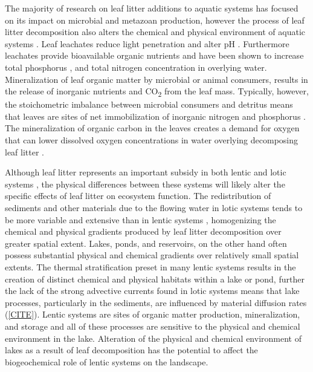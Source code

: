 The majority of research on leaf litter additions to aquatic systems has focused on its impact on microbial and metazoan production, however the process of leaf litter decomposition also alters the chemical and physical environment of aquatic systems \cite{Gessner_1999}. Leaf leachates reduce light penetration \cite{CITE} and alter pH \cite{CITE}. Furthermore leachates provide bioavailable organic nutrients \cite{McConnell_1968,Duan_2014} and have been shown to increase total phosphorus \cite{Feh_2015b}, and total nitrogen \cite{Feh_2015} concentration in overlying water. Mineralization of leaf organic matter by microbial or animal consumers, results in the release of inorganic nutrients and CO\textsubscript{2} \cite{CITE} from the leaf mass. Typically, however, the stoichometric imbalance between microbial consumers and detritus means that leaves are sites of net immobilization of inorganic nitrogen and phosphorus \cite{CITE}. The mineralization of organic carbon in the leaves creates a demand for oxygen \cite{CITE} that can lower dissolved oxygen concentrations in water overlying decomposing leaf litter \cite{Hodkinson_1975,Rubbo_2008,Mehring_2014,Feh_2015b}.

Although leaf litter represents an important subsidy in both lentic and lotic systems \cite{Webster_1986}, the physical differences between these systems will likely alter the specific effects of leaf litter on ecosystem function. The redistribution of sediments and other materials due to the flowing water in lotic systems tends to be more variable and extensive than in lentic systems \cite{Wetzel_2001}, homogenizing the chemical and physical gradients produced by leaf litter decomposition over greater spatial extent.  Lakes, ponds, and reservoirs, on the other hand often possess substantial physical and chemical gradients over relatively small spatial extents. The thermal stratification preset in many lentic systems results in the creation of distinct chemical and physical habitats within a lake or pond, further the lack of the strong advective currents found in lotic systems means that lake processes, particularly in the sediments, are influenced by material diffusion rates (\ref{CITE}). Lentic systems are sites of organic matter production, mineralization, and storage \cite{Tranvik_2009} and all of these processes are sensitive to the physical and chemical environment in the lake. Alteration of the physical and chemical environment of lakes as a result of leaf decomposition has the potential to affect the biogeochemical role of lentic systems on the landscape. 

